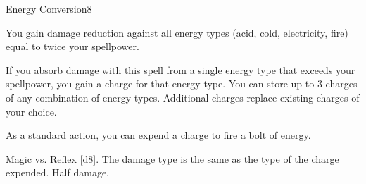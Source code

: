 \begin{spellsection}{Energy Conversion}{8}
    \begin{spellheader}
    \end{spellheader}
    \begin{spellcontent}
        \begin{spelleffects}
            \spelleffect You gain damage reduction against all energy types (acid, cold, electricity, fire) equal to twice your spellpower.

            If you absorb damage with this spell from a single energy type that exceeds your spellpower, you gain a charge for that energy type. You can store up to 3 charges of any combination of energy types. Additional charges replace existing charges of your choice.
            \spelldur \durlong
        \end{spelleffects}
    \end{spellcontent}
    \begin{spellsubcontent}
        \begin{spelltargetinginfo}
            \spellspecial As a standard action, you can expend a charge to fire a bolt of energy.
        \end{spelltargetinginfo}
        \begin{spelleffects}
            \begin{spellattack}{Magic vs. Reflex}
                \spellsuccess {}[d8]. The damage type is the same as the type of the charge expended.
                \spellfailure Half damage.
            \end{spellattack}
        \end{spelleffects}
    \end{spellsubcontent}
    \begin{spellfooter}
        \miscastexplode
    \end{spellfooter}
\end{spellsection}

